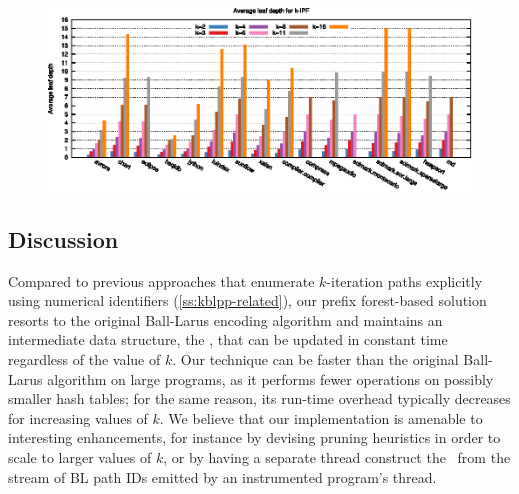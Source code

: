 \vspace{-1em}

\ifdefined\noauthorea
\begin{figure}[!ht]
\begin{center}
\includegraphics[width=\textwidth]{figures/kblpp-kipf-leaves/kblpp-kipf-leaves.eps}
\caption{\protect}
\end{center}
\end{figure}
\fi

\subsection{Discussion}
Compared to previous approaches that enumerate $k$-iteration paths explicitly using numerical identifiers (\mysection\ref{ss:kblpp-related}), our prefix forest-based solution resorts to the original Ball-Larus encoding algorithm and maintains an intermediate data structure, the \ksf, that can be updated in constant time regardless of the value of $k$. Our technique can be faster than the original Ball-Larus algorithm on large programs, as it performs fewer operations on possibly smaller hash tables; for the same reason, its run-time overhead typically decreases for increasing values of $k$. We believe that our implementation is amenable to interesting enhancements, for instance by devising pruning heuristics in order to scale to larger values of $k$, or by having a separate thread construct the \ksf\ from the stream of BL path IDs emitted by an instrumented program's thread.
